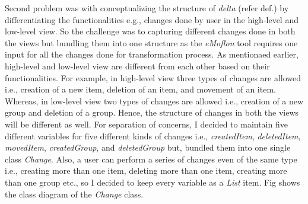 Second problem was with conceptualizing the structure of \textit{delta} (refer def.) by differentiating the functionalities e.g., changes done by user in the high-level and low-level view. So the challenge was to capturing different changes done in both the views but bundling them into one structure as the \textit{eMoflon} tool requires one input for all the changes done for transformation process. As mentionaed earlier, high-level and low-level view are different from each other based on their functionalities. For example, in high-level view three types of changes are allowed i.e., creation of a new item, deletion of an item, and movement of an item. Whereas, in low-level view two types of changes are allowed i.e., creation of a new group and deletion of a group. Hence, the structure of changes in both the views will be different as well. For separation of concerns, I decided to maintain five different variables for five different kinds of changes i.e., \textit{createdItem}, \textit{deletedItem}, \textit{movedItem}, \textit{createdGroup}, and \textit{deletedGroup} but, bundled them into one single class \textit{Change}. Also, a user can perform a series of changes even of the same type i.e., creating more than one item, deleting more than one item, creating more than one group etc., so I decided to keep every variable as a \textit{List} item. Fig shows the class diagram of the \textit{Change} class.










